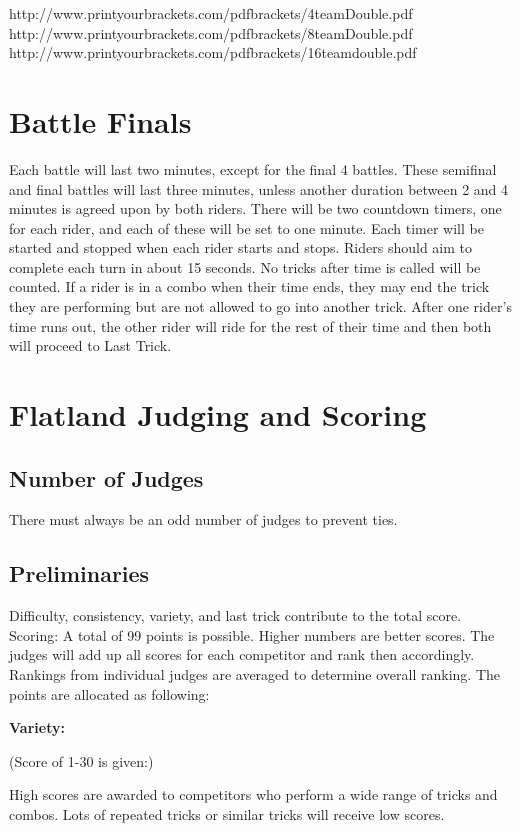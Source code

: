 http://www.printyourbrackets.com/pdfbrackets/4teamDouble.pdf \\
http://www.printyourbrackets.com/pdfbrackets/8teamDouble.pdf \\
http://www.printyourbrackets.com/pdfbrackets/16teamdouble.pdf

\section{Battle Finals}
Each battle will last two minutes, except for the final 4 battles.
These semifinal and final battles will last three minutes, unless another duration between 2 and 4 minutes is agreed upon by both riders.
There will be two countdown timers, one for each rider, and each of these will be set to one minute.
Each timer will be started and stopped when each rider starts and stops.
Riders should aim to complete each turn in about 15 seconds.
No tricks after time is called will be counted.
If a rider is in a combo when their time ends, they may end the trick they are performing but are not allowed to go into another trick.
After one rider's time runs out, the other rider will ride for the rest of their time and then both will proceed to Last Trick.

\section{Flatland Judging and Scoring \label{sec:flat-street_flatland-judging-scoring}}

\subsection{Number of Judges}
There must always be an odd number of judges to prevent ties. 

\subsection{Preliminaries}
Difficulty, consistency, variety, and last trick contribute to the total score.
Scoring: A total of 99 points is possible.
Higher numbers are better scores.
The judges will add up all scores for each competitor and rank then accordingly.
Rankings from individual judges are averaged to determine overall ranking.
The points are allocated as following: 

\textbf{Variety:}

(Score of 1-30 is given:)

High scores are awarded to competitors who perform a wide range of tricks and combos.
Lots of repeated tricks or similar tricks will receive low scores.

